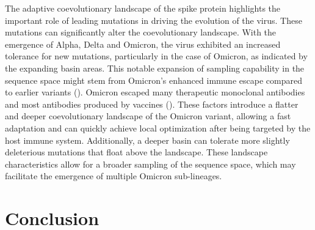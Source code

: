 \documentclass{sysbio}%
\begin{document}

The adaptive coevolutionary landscape of the spike protein highlights the important role of leading mutations in driving the evolution of the virus. These mutations can significantly alter the coevolutionary landscape. With the emergence of Alpha, Delta and Omicron, the virus exhibited an increased tolerance for new mutations, particularly in the case of Omicron, as indicated by the expanding basin areas. This notable expansion of sampling capability in the sequence space might stem from Omicron's enhanced immune escape compared to earlier variants (\cite{omi_anti_escape}). Omicron escaped many therapeutic monoclonal antibodies and most antibodies produced by vaccines (\cite{omicron_vaccine_escape,omi_anti_escape}). These factors introduce a flatter and deeper coevolutionary landscape of the Omicron variant, allowing a fast adaptation and can quickly achieve local optimization after being targeted by the host immune system. Additionally, a deeper basin can tolerate more slightly deleterious mutations that float above the landscape. These landscape characteristics allow for a broader sampling of the sequence space, which may facilitate the emergence of multiple Omicron sub-lineages. 



\section{Conclusion}
\end{document}
